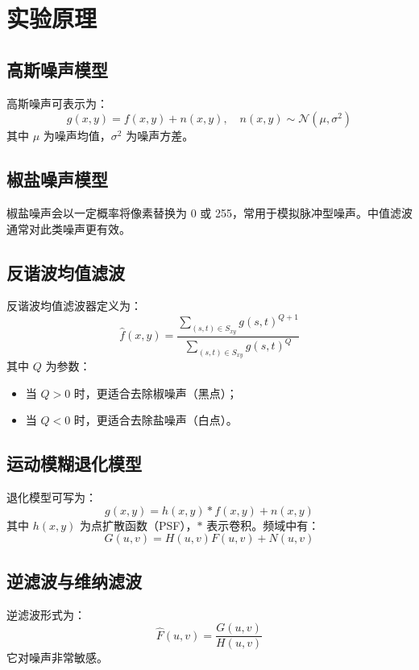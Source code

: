 \documentclass[UTF8,a4paper,12pt]{ctexart}
\begin{document}
\section{实验原理}
\subsection{高斯噪声模型}
高斯噪声可表示为：
\begin{equation}
g(x,y)=f(x,y)+n(x,y), \quad n(x,y)\sim \mathcal{N}(\mu,\sigma^2)
\end{equation}
其中 $\mu$ 为噪声均值，$\sigma^2$ 为噪声方差。

\subsection{椒盐噪声模型}
椒盐噪声会以一定概率将像素替换为 0 或 255，常用于模拟脉冲型噪声。中值滤波通常对此类噪声更有效。

\subsection{反谐波均值滤波}
反谐波均值滤波器定义为：
\begin{equation}
\hat{f}(x,y)=
\frac{\sum\limits_{(s,t)\in S_{xy}} g(s,t)^{Q+1}}
{\sum\limits_{(s,t)\in S_{xy}} g(s,t)^Q}
\end{equation}
其中 $Q$ 为参数：
\begin{itemize}
  \item 当 $Q>0$ 时，更适合去除椒噪声（黑点）；
  \item 当 $Q<0$ 时，更适合去除盐噪声（白点）。
\end{itemize}

\subsection{运动模糊退化模型}
退化模型可写为：
\begin{equation}
g(x,y)=h(x,y)*f(x,y)+n(x,y)
\end{equation}
其中 $h(x,y)$ 为点扩散函数（PSF），$*$ 表示卷积。频域中有：
\begin{equation}
G(u,v)=H(u,v)F(u,v)+N(u,v)
\end{equation}

\subsection{逆滤波与维纳滤波}
逆滤波形式为：
\begin{equation}
\hat{F}(u,v)=\frac{G(u,v)}{H(u,v)}
\end{equation}
它对噪声非常敏感。
\end{document}
